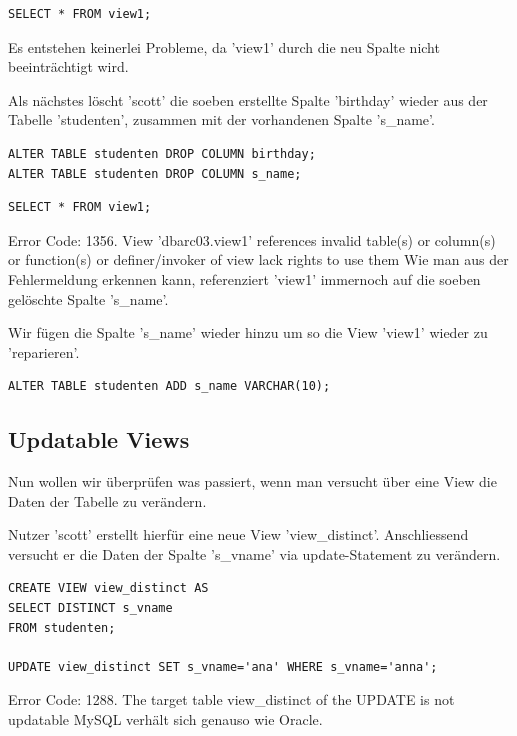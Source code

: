 \documentclass[10pt]{scrreprt}
\begin{document}
\begin{lstlisting}[style=sql]
SELECT * FROM view1;
\end{lstlisting}
Es entstehen keinerlei Probleme, da 'view1' durch die neu Spalte nicht beeinträchtigt wird.\newline\newline

Als nächstes löscht 'scott' die soeben erstellte Spalte 'birthday' wieder aus der Tabelle 'studenten', zusammen mit der vorhandenen Spalte 's\_name'.
\begin{lstlisting}[style=sql]
ALTER TABLE studenten DROP COLUMN birthday;
ALTER TABLE studenten DROP COLUMN s_name;
\end{lstlisting}

\begin{lstlisting}[style=sql]
SELECT * FROM view1;
\end{lstlisting}
Error Code: 1356. View 'dbarc03.view1' references invalid table(s) or column(s) or function(s) or definer/invoker of view lack rights to use them\newline\newline
Wie man aus der Fehlermeldung erkennen kann, referenziert 'view1' immernoch auf die soeben gelöschte Spalte 's\_name'.\newline\newline

Wir fügen die Spalte 's\_name' wieder hinzu um so die View 'view1' wieder zu 'reparieren'.
\begin{lstlisting}[style=sql]
ALTER TABLE studenten ADD s_name VARCHAR(10);
\end{lstlisting}

\subsection{Updatable Views}
Nun wollen wir überprüfen was passiert, wenn man versucht über eine View die Daten der Tabelle zu verändern.\newline\newline

Nutzer 'scott' erstellt hierfür eine neue View 'view\_distinct'. Anschliessend versucht er die Daten der Spalte 's\_vname' via update-Statement zu verändern.
\begin{lstlisting}[style=sql]
CREATE VIEW view_distinct AS
SELECT DISTINCT s_vname
FROM studenten;

UPDATE view_distinct SET s_vname='ana' WHERE s_vname='anna';
\end{lstlisting}
Error Code: 1288. The target table view\_distinct of the UPDATE is not updatable\newline\newline
MySQL verhält sich genauso wie Oracle.\newline\newline
\end{document}
